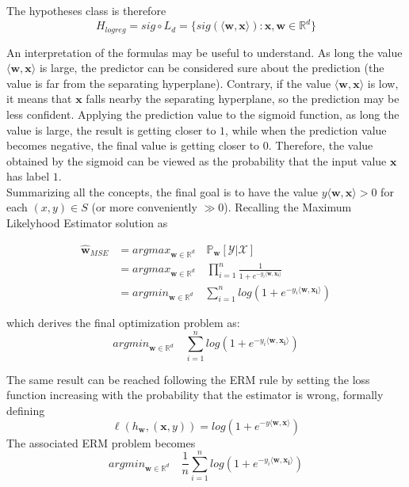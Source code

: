 The hypotheses class is therefore
\[ H_{logreg} = sig \circ L_d = \{ sig(\langle \mathbf{w}, \mathbf{x} \rangle) : \mathbf{x}, \mathbf{w} \in \mathbb{R}^d \} \]

An interpretation of the formulas may be useful to understand. As long the value $\langle \mathbf{w}, \mathbf{x} \rangle$ is large, the predictor can be considered sure about the prediction (the value is far from the separating hyperplane). Contrary, if the value $\langle \mathbf{w}, \mathbf{x} \rangle$ is low, it means that $\mathbf{x}$ falls nearby the separating hyperplane, so the prediction may be less confident. Applying the prediction value to the sigmoid function, as long the value is large, the result is getting closer to $1$, while when the prediction value becomes negative, the final value is getting closer to $0$.
Therefore, the value obtained by the sigmoid can be viewed as the probability that the input value $\mathbf{x}$ has label $1$.\\
Summarizing all the concepts, the final goal is to have the value $y \langle \mathbf{w}, \mathbf{x} \rangle > 0$ for each $(x, y) \in S$ (or more conveniently $\gg 0$). Recalling the Maximum Likelyhood Estimator solution as

\begin{align*}
 \hat{\mathbf{w}}_{MSE} &= argmax_{\mathbf{w} \in \mathbb{R}^d} \quad \mathbb{P}_\mathbf{w}[\mathcal{Y} | \mathcal{X}]	\\
 						&= argmax_{\mathbf{w} \in \mathbb{R}^d} \quad \prod_{i=1}^{n} \frac{1}{1 + e^{-y_i \langle \mathbf{w}, \mathbf{x_i} \rangle}}	\\
 						&= argmin_{\mathbf{w} \in \mathbb{R}^d} \quad \sum_{i=1}^{n} log(1 + e^{-y_i \langle \mathbf{w}, \mathbf{x_i} \rangle})
\end{align*}

which derives the final optimization problem as:
\[ argmin_{\mathbf{w} \in \mathbb{R}^d} \quad \sum_{i=1}^{n} log(1 + e^{-y_i \langle \mathbf{w}, \mathbf{x_i} \rangle}) \]

The same result can be reached following the \ac{ERM} rule by setting the loss function increasing with the probability that the estimator is wrong, formally defining
\[ \ell (h_\mathbf{w}, (\mathbf{x}, y)) = log(1 + e^{-y \langle \mathbf{w}, \mathbf{x} \rangle}) \]
The associated ERM problem becomes
\[ argmin_{\mathbf{w} \in \mathbb{R}^d} \quad \frac{1}{n} \sum_{i=1}^{n} log(1 + e^{-y_i \langle \mathbf{w}, \mathbf{x_i} \rangle}) \]



